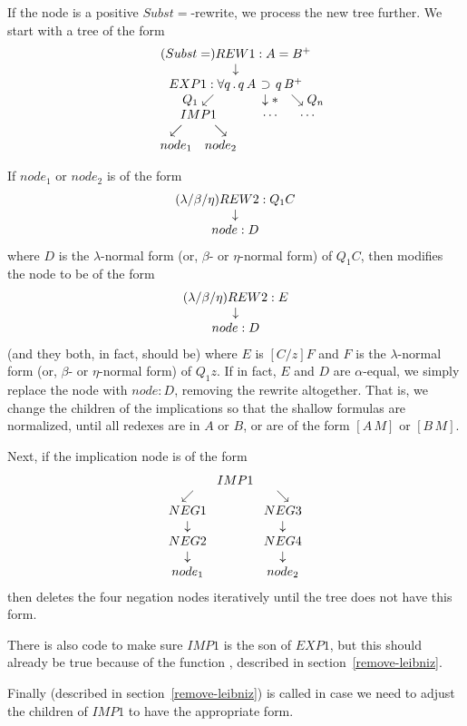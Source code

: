 \begin{enumerate}
\begin{itemize}
If the node is a positive $Subst=$-rewrite, we process the new tree further.
We start with a tree of the form
$$\erew{1}{Subst=}{A = B^+}
{\gexpnode{1}{\forall q\, . \, q\, A \, \limplies\, q\, B^+}
{Q_1}{\eimp{1}{Q_1\, A\, \limplies \, Q_1\, B^+}{node_1}{node_2}}
{Q_n}{\cdots}}$$

If $node_1$ or $node_2$ is of the form
$$\erew{2}{\lambda/\beta/\eta}{Q_1 C}{node: D}$$
where $D$ is the $\lambda$-normal form (or, $\beta$- or $\eta$-normal form)
of $Q_1 C$, then
modifies the node to be of the form
$$\erew{2}{\lambda/\beta/\eta}{E}{node: D}$$
(and they both, in fact, should be)
where $E$ is $[C/z]F$ and $F$ is the $\lambda$-normal form (or, $\beta$- or
$\eta$-normal form) of $Q_1 z$.
If in fact, $E$ and $D$ are $\alpha$-equal,
we simply replace the node with $node: D$, removing the rewrite altogether.
That is, we change the children of the implications so that
the shallow formulas are normalized, until all redexes are
in $A$ or $B$, or are of the form $[A\, M]$ or $[B\, M]$.

Next, if the implication node is of the form
$$\eimp{1}{\lnot\lnot C\, \limplies \, \lnot\lnot D}{\eneg{1}{\lnot\lnot C}{\eneg{2}{\lnot C}{node_1}}}
{\eneg{3}{\lnot\lnot D}{\eneg{4}{\lnot D}{node_2}}}$$
then 
deletes the four negation nodes iteratively until
the tree does not have this form.

There is also code to make sure $IMP1$ is the son of $EXP1$,
but this should already be true because of the function
, described in section~\ref{remove-leibniz}.

Finally  (described in section~\ref{remove-leibniz})
is called in case we need to adjust the children of $IMP1$ to have the
appropriate form.


\end{itemize}
\end{enumerate}
